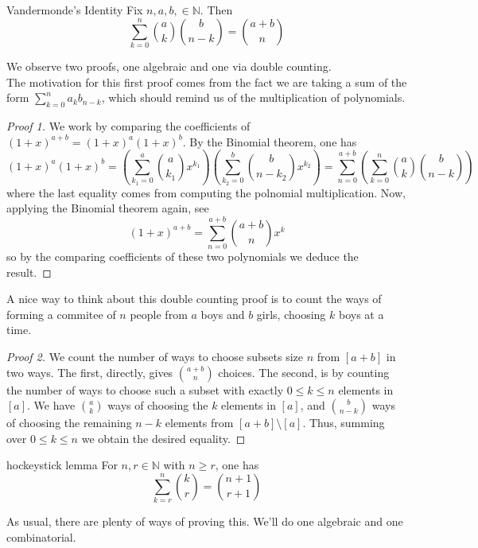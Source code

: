 \documentclass{article}
\begin{document}
\begin{proposition}[]{Vandermonde's Identity}
    Fix $n, a, b, \in \mathbb{N}$. Then 
    \[\sum_{k=0}^n \binom{a}{k}\binom{b}{n-k} = \binom{a + b}{n}\]
\end{proposition}

We observe two proofs, one algebraic and one via double counting. \\ 

The motivation for this first proof comes from the fact we are taking a sum of the form $\sum_{k=0}^n a_kb_{n-k}$, 
which should remind us of the multiplication of polynomials. 

\begin{proof}[Proof 1]
    We work by comparing the coefficients of $(1+x)^{a+b} = (1+x)^a(1+x)^b$. By the Binomial theorem, one has
    \[(1+x)^a (1+x)^b = \left(\sum_{k_1=0}^a \binom{a}{k_1}x^{k_1}\right)\left(\sum_{k_2=0}^b \binom{b}{n - k_2}x^{k_2}\right)
    = \sum_{n=0}^{a+b}\left(\sum_{k=0}^n \binom{a}{k}\binom{b}{n-k}\right)\]
    where the last equality comes from computing the polnomial multiplication. Now, applying the Binomial theorem again, see 
    \[(1+x)^{a+b} = \sum_{n=0}^{a+b}\binom{a+b}{n}x^k\]
    so by the comparing coefficients of these two polynomials we deduce the result.
\end{proof}

A nice way to think about this double counting proof is to count the ways of forming a commitee of $n$ people from 
$a$ boys and $b$ girls, choosing $k$ boys at a time.

\begin{proof}[Proof 2]
    We count the number of ways to choose subsets size $n$ from $[a+b]$ in two ways. The first, directly, gives 
    $\binom{a+b}{n}$ choices. The second, is by counting the number of ways to choose such a subset with exactly 
    $0 \leq k \leq n$ elements in $[a]$. We have $\binom{a}{k}$ ways of choosing the $k$ elements in $[a]$, and 
    $\binom{b}{n-k}$ ways of choosing the remaining $n-k$ elements from $[a+b] \setminus [a]$. Thus, summing over 
    $0 \leq k \leq n$ we obtain the desired equality.
\end{proof}

\begin{proposition}[]{hockeystick lemma}
    For $n, r \in \mathbb{N}$ with $n \geq r$, one has \[\sum_{k=r}^n \binom{k}{r} = \binom{n+1}{r+1}\]
\end{proposition}

As usual, there are plenty of ways of proving this. We'll do one algebraic and one combinatorial. 
\end{document}
